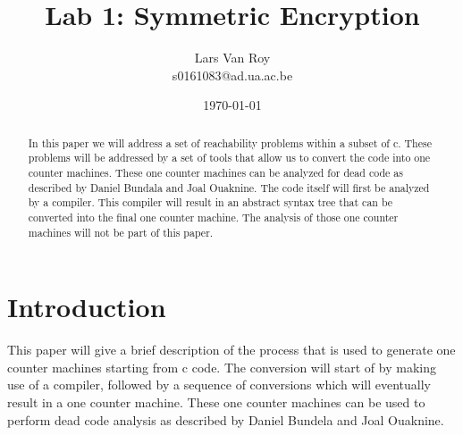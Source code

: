\documentclass{article}%
\title{Lab 1: Symmetric Encryption}
\date{\today}
\author{Lars Van Roy\\s0161083@ad.ua.ac.be}
\begin{document}
	\maketitle
	
	\begin{abstract}
		In this paper we will address a set of reachability problems within a subset of c. These problems will be addressed by a set of tools that allow us to convert the code into one counter machines. These one counter machines can be analyzed for dead code as described by Daniel Bundala and Joal Ouaknine. The code itself will first be analyzed by a compiler. This compiler will result in an abstract syntax tree that can be converted into the final one counter machine. The analysis of those one counter machines will not be part of this paper.
	\end{abstract}

	\newpage
	
	\tableofcontents
	
	\newpage
	
	\section{Introduction}
	This paper will give a brief description of the process that is used to generate one counter machines starting from c code. The conversion will start of by making use of a compiler, followed by a sequence of conversions which will eventually result in a one counter machine. These one counter machines can be used to perform dead code analysis as described by Daniel Bundela and Joal Ouaknine.
	
\end{document}
